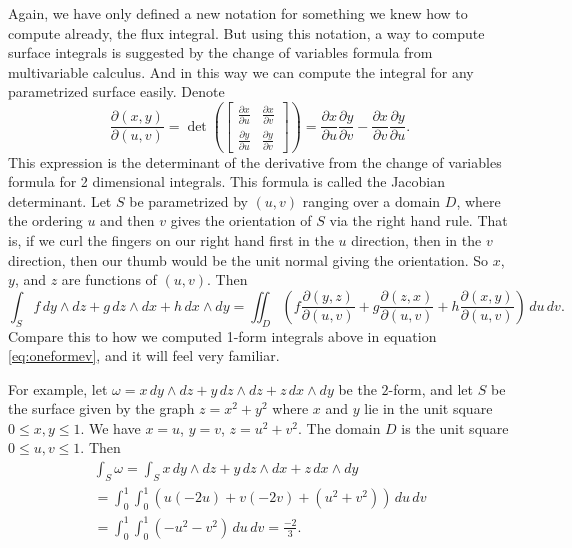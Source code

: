 \documentclass[12pt]{article}
\begin{document}
Again, we have only defined a new notation for something we knew how
to compute already,
the flux integral.  But using this notation,
a way to compute surface integrals is suggested by the change of
variables formula from multivariable calculus.  And in this way we can
compute the integral for any parametrized surface easily.
Denote
\[
\frac{\partial (x,y)}{\partial (u,v)}
=
\det \left(
\begin{bmatrix}
\frac{\partial x}{\partial u}
&
\frac{\partial x}{\partial v}
\\[3pt]
\frac{\partial y}{\partial u} 
&
\frac{\partial y}{\partial v}
\end{bmatrix}
\right)
=
\frac{\partial x}{\partial u}
\frac{\partial y}{\partial v}
-
\frac{\partial x}{\partial v}
\frac{\partial y}{\partial u} .
\]
This expression is the determinant of the derivative from the
change of variables formula for 2 dimensional integrals.
This formula is called the Jacobian determinant.
Let $S$ be parametrized by $(u,v)$ ranging over a domain $D$,
where the ordering $u$ and then $v$
gives the orientation of $S$ via the right hand rule.
That is, if we curl the fingers  on our right hand first in the $u$ direction,
then in the $v$ direction,
then our thumb would be the unit normal giving the orientation.
So $x$, $y$, and $z$ are functions of $(u,v)$.
Then
\begin{equation*}
\int_S
f\, dy \wedge dz + 
g\, dz \wedge dx +
h\, dx \wedge dy
=
\iint_D
\left(
f 
\frac{\partial (y,z)}{\partial (u,v)}
+
g
\frac{\partial (z,x)}{\partial (u,v)}
+
h
\frac{\partial (x,y)}{\partial (u,v)}
\right)
\,
du\, dv .
\end{equation*}
Compare this to how we computed 1-form integrals above in
equation \eqref{eq:oneformev}, and it will feel very familiar.

For example, let $\omega = x \, dy \wedge dz + y \, dz \wedge dz
+ z \, dx \wedge dy$ be the
$2$-form, and let
$S$ be the surface given by the graph $z=x^2+y^2$ where $x$ and $y$ lie in
the unit square $0 \leq x,y \leq 1$.  We have $x=u$, $y=v$, $z=u^2+v^2$.
The domain $D$ is the unit square $0 \leq u,v \leq 1$.  Then
\begin{multline*}
\int_S \omega =
\int_S
x\, dy \wedge dz + 
y\, dz \wedge dx +
z\, dx \wedge dy
\\
=
\int_0^1 \int_0^1
\left(
u 
(-2u)
+
v
(-2v)
+
(u^2+v^2)
\right)
\,
du\, dv 
\\
=
\int_0^1 \int_0^1
(-u^2-v^2)
\,
du\, dv 
=
\frac{-2}{3} .
\end{multline*}
\end{document}
